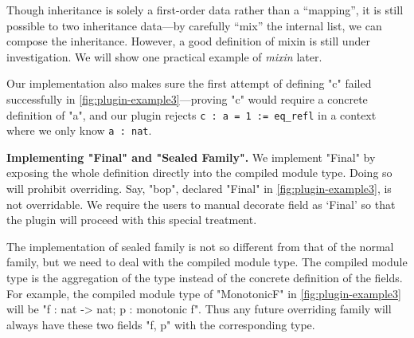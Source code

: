 Though inheritance is solely a first-order data rather
than a ``mapping'', it is still possible to  two inheritance
data---by carefully ``mix'' the internal list, we can compose the
inheritance. However, a good definition of mixin is still under
investigation. We will show one practical example of \textit{mixin}
later.

Our implementation also makes sure the first attempt of defining "c"
failed successfully in \cref{fig:plugin-example3}---proving "c"
would require a concrete definition of "a", and our plugin rejects
\texttt{c : a = 1 := eq_refl} in a context where we
only know \texttt{a : nat}.



\textbf{Implementing "Final" and "Sealed Family".}
We implement "Final" by
exposing the whole definition directly into the compiled module type.
Doing so will prohibit overriding. Say, "bop", declared "Final" in
\cref{fig:plugin-example3}, is not overridable.
We require the users to manual decorate field as `Final' so that the
plugin will proceed with this special treatment.


The implementation of sealed family is not so different from that of the normal family, but we need to deal with the compiled module type. The compiled module type is the aggregation of the type instead of the concrete definition of the fields.
For example, the compiled module type of
"MonotonicF" in \cref{fig:plugin-example3} will be "{f : nat -> nat; p : monotonic f}". Thus any future overriding family will always have these two fields "f, p" with the corresponding type.


